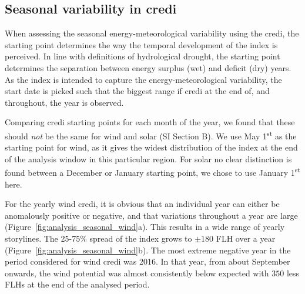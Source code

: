 \documentclass[12pt]{iopart}
\newcommand{\ts}[1]{\textsuperscript{#1}}
\newcommand{\credi}[0]{{\sc credi}}
\newcommand{\wdi}[0]{{\sc wind credi}}
\begin{document}

\subsection{Seasonal variability in \credi}\label{sc:seasonal}
When assessing the seasonal energy-meteorological variability using the \credi, the starting point determines the way the temporal development of the index is perceived. 
In line with definitions of hydrological drought, the starting point determines the separation between energy surplus (wet) and deficit (dry) years. 
As the index is intended to capture the energy-meteorological variability, the start date is picked such that the biggest range if \credi{} at the end of, and throughout, the year is observed. 

Comparing \credi{} starting points for each month of the year, we found that these should \emph{not} be the same for wind and solar (SI Section B). 
We use May 1\ts{st} as the starting point for wind, as it gives the widest distribution of the index at the end of the analysis window in this particular region.  
For solar no clear distinction is found between a December or January starting point, we chose to use January 1\ts{st} here.

For the yearly \wdi, it is obvious that an individual year can either be anomalously positive or negative, and that variations throughout a year are large (Figure~\ref{fig:analysis_seasonal_wind}a). 
This results in a wide range of yearly storylines. 
The 25-75\% spread of the index grows to $\pm180$ FLH over a year (Figure~\ref{fig:analysis_seasonal_wind}b). 
The most extreme negative year in the period considered for \wdi{} was 2016. 
In that year, from about September onwards, the wind potential was almost consistently below expected with $350$ less FLHs at the end of the analysed period.
\end{document}
